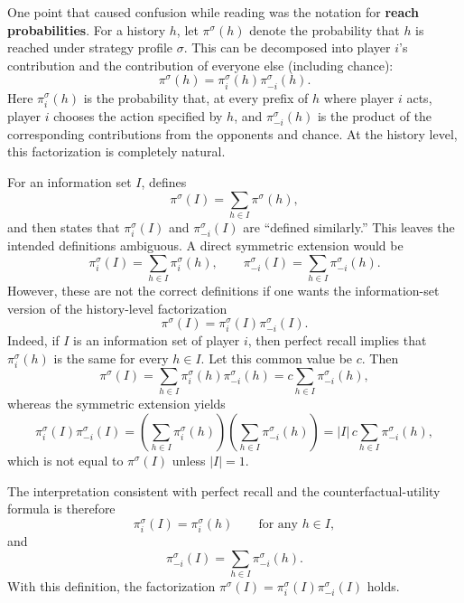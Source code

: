 \documentclass[11pt]{article}
\begin{document}
One point that caused confusion while reading \cite{zinkevich2007} was the notation for \textbf{reach probabilities}. For a history $h$, let $\pi^\sigma(h)$ denote the probability that $h$ is reached under strategy profile $\sigma$. This can be decomposed into player $i$'s contribution and the contribution of everyone else (including chance):
\[
\pi^\sigma(h) = \pi_i^\sigma(h)\pi_{-i}^\sigma(h).
\]
Here $\pi_i^\sigma(h)$ is the probability that, at every prefix of $h$ where player $i$ acts, player $i$ chooses the action specified by $h$, and $\pi_{-i}^\sigma(h)$ is the product of the corresponding contributions from the opponents and chance. At the history level, this factorization is completely natural.

For an information set $I$, \cite{zinkevich2007} defines
\[
\pi^\sigma(I) = \sum_{h \in I} \pi^\sigma(h),
\]
and then states that $\pi_i^\sigma(I)$ and $\pi_{-i}^\sigma(I)$ are ``defined similarly.'' This leaves the intended definitions ambiguous. A direct symmetric extension would be
\[
\pi_i^\sigma(I) = \sum_{h \in I} \pi_i^\sigma(h),
\qquad
\pi_{-i}^\sigma(I) = \sum_{h \in I} \pi_{-i}^\sigma(h).
\]
However, these are not the correct definitions if one wants the information-set version of the history-level factorization
\[
\pi^\sigma(I) = \pi_i^\sigma(I)\pi_{-i}^\sigma(I).
\]
Indeed, if $I$ is an information set of player $i$, then perfect recall implies that $\pi_i^\sigma(h)$ is the same for every $h \in I$. Let this common value be $c$. Then
\[
\pi^\sigma(I)
=
\sum_{h \in I} \pi_i^\sigma(h)\pi_{-i}^\sigma(h)
=
c\sum_{h \in I}\pi_{-i}^\sigma(h),
\]
whereas the symmetric extension yields
\[
\pi_i^\sigma(I)\pi_{-i}^\sigma(I)
=
\left(\sum_{h \in I}\pi_i^\sigma(h)\right)\left(\sum_{h \in I}\pi_{-i}^\sigma(h)\right)
=
|I|\,c\sum_{h \in I}\pi_{-i}^\sigma(h),
\]
which is not equal to $\pi^\sigma(I)$ unless $|I| = 1$.

The interpretation consistent with perfect recall and the counterfactual-utility formula is therefore
\[
\pi_i^\sigma(I) = \pi_i^\sigma(h)
\qquad \text{for any } h \in I,
\]
and
\[
\pi_{-i}^\sigma(I) = \sum_{h \in I} \pi_{-i}^\sigma(h).
\]
With this definition, the factorization $\pi^\sigma(I) = \pi_i^\sigma(I)\pi_{-i}^\sigma(I)$ holds.
\end{document}
